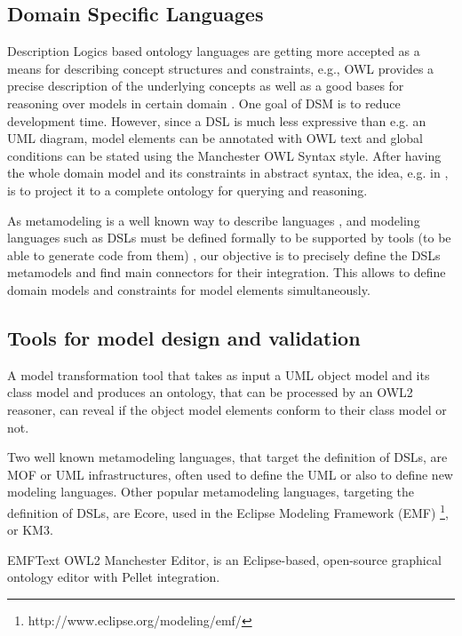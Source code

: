 \documentclass[[10pt,abbrv]{llncs}
\begin{document}
\subsection{Domain Specific Languages}
Description Logics based ontology languages are getting more accepted as a means for describing concept structures and constraints, e.g., OWL provides a precise description of the underlying concepts as well as a good bases for reasoning over models in certain domain \cite{Walter2009}. One goal of DSM is to reduce development time. However, since a DSL is much less expressive than e.g. an UML diagram, model elements can be annotated with OWL text and global conditions can be stated using the Manchester OWL Syntax style. After having the whole domain model and its constraints in abstract syntax, the idea, e.g. in \cite{Walter2009}, is to project it to a complete ontology for querying and reasoning.

As metamodeling is a well known way to describe languages \cite{Bezivin01}, and modeling languages such as DSLs must be defined formally to be supported by tools (to be able to generate code from them) \cite{DSM}, our objective is to precisely define the DSLs metamodels and find main connectors for their integration. This allows to define domain models and constraints for model elements simultaneously.


\subsection{Tools for model design and validation}
A model transformation tool \cite{Khan11} that takes as input a UML object model and its class model and produces an ontology, that can be processed by an OWL2 reasoner, can reveal if the object model elements conform to their class model or not.

Two well known metamodeling languages, that target the definition of DSLs, are MOF or UML infrastructures, often used to define the UML or also to define new modeling languages. Other popular metamodeling languages, targeting the definition of DSLs, are Ecore, used in the Eclipse Modeling Framework (EMF) \footnote{http://www.eclipse.org/modeling/emf/}, or KM3. %

EMFText OWL2 Manchester Editor, is an Eclipse-based, open-source graphical ontology editor with Pellet integration.

\end{document}
